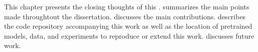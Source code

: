 
This chapter presents the closing thoughts of this
\thesisdiss{}.  summarizes
the main points made throughtout the dissertation.
 discusses the main
contributions. 
describes the code repository accompanying this work as well
as the location of pretrained models, data, and experiments
to reproduce or extend this work. 
discusses future work.
